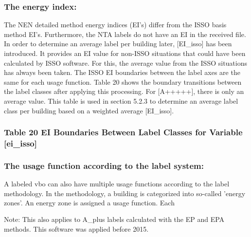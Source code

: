 \documentclass{article}
\begin{document}
\subsubsection*{The energy index:}
The NEN detailed method energy indices (EI’s) differ from the ISSO basis method EI’s. Furthermore, the NTA labels do not have an EI in the received file. In order to determine an average label per building later, [EI_isso] has been introduced. It provides an EI value for non-ISSO situations that could have been calculated by ISSO software. For this, the average value from the ISSO situations has always been taken. The ISSO EI boundaries between the label axes are the same for each usage function. Table 20 shows the boundary transitions between the label classes after applying this processing. For [A+++++], there is only an average value. This table is used in section 5.2.3 to determine an average label class per building based on a weighted average [EI_isso].

\subsubsection*{Table 20 EI Boundaries Between Label Classes for Variable [ei_isso]}
 
\subsubsection*{The usage function according to the label system:}
A labeled vbo can also have multiple usage functions according to the label methodology. In the methodology, a building is categorized into so-called 'energy zones'. An energy zone is assigned a usage function. Each 

\footnotesize{Note: This also applies to A_plus labels calculated with the EP and EPA methods. This software was applied before 2015.}
 
\end{document}
